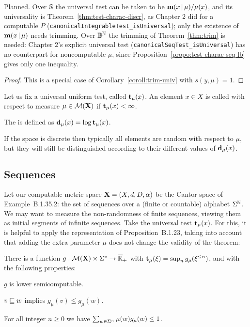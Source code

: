 \begin{formalization}
Planned. Over $\mathbb{S}$ the universal test can be taken to be $\mathbf{m}(x \,\vert\, \mu)/\mu(x)$, and its
universality is Theorem~\ref{thm:test-charac-discr}, as Chapter 2 did for a computable $P$
(\texttt{canonicalIntegrableTest\_isUniversal}); only the existence of $\mathbf{m}(x \,\vert\, \mu)$ needs
trimming. Over $\mathbb{B}^{\mathbb{N}}$ the trimming of Theorem~\ref{thm:trim} is needed: Chapter 2's explicit
universal test (\texttt{canonicalSeqTest\_isUniversal}) has no counterpart for noncomputable
$\mu$, since Proposition~\ref{propo:test-charac-seq-lb} gives only one inequality.
\end{formalization}
 \begin{proof}
This is a special case of Corollary~\ref{coroll:trim-univ} with \( s(y,\mu)=1 \).
 \end{proof}

\begin{definition}
  \label{def:g4.1.5}
Let us fix a universal uniform test, called \( \mathbf{t}_{\mu}(x) \).
An element \( x\in X \) is called  with respect to measure
\( \mu\in\mathcal{M}(\mathbf{X}) \) if \( \mathbf{t}_{\mu}(x)<\infty \).

The  is defined as \( \mathbf{d}_{\mu}(x) = \log\mathbf{t}_{\mu}(x) \).
\end{definition}

If the space is discrete then typically all elements are random with respect to
\( \mu \), but they will still be distinguished according to their different values
of \( \mathbf{d}_{\mu}(x) \).

\subsection{Sequences}

Let our computable metric space \( \mathbf{X}=(X,d,D,\alpha) \) be the Cantor space
of Example~B.1.35.2:
the set of sequences over a (finite or countable) alphabet \( \Sigma^{\mathbb{N}} \).
We may want to measure the non-randomness of finite sequences, viewing them
as initial segments of infinite sequences.
Take the universal test \( \mathbf{t}_{\mu}(x) \).
For this, it is helpful to apply the representation of
Proposition~B.1.23, taking into account that adding
the extra parameter \( \mu \) does not change the validity of the theorem:

 \begin{proposition}\label{propo:finite-test}
There is a function
\( g:\mathcal{M}(\mathbf{X})\times\Sigma^{*}\to\overline{\mathbb{R}}_{+} \) 
with \( \mathbf{t}_{\mu}(\xi) = \sup_{n} g_{\mu}(\xi^{\le n}) \), and 
with the following properties:
 \begin{alphenum}
  \item \( g \) is lower semicomputable.
  \item \( v\sqsubseteq w \) implies \( g_{\mu}(v)\le g_{\mu}(w) \).
  \item\label{i:extended.sum} For all integer \( n\ge 0 \) we have 
\( \sum_{w\in\Sigma^{n}}\mu(w)g_{\mu}(w) \le 1 \).
 \end{alphenum}
 \end{proposition}

